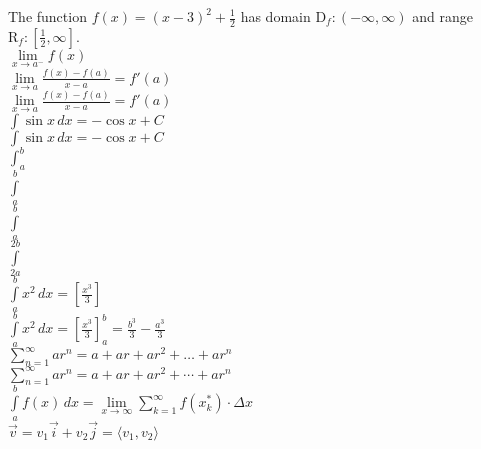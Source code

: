 \documentclass[11pt, a4paper]{article}
\begin{document}
The function $f(x) = (x-3)^2 + \frac{1}{2}$ has domain $\mathrm{D}_f:(-\infty, \infty)$ and range $\mathrm{R}_f:\left [\frac{1}{2}, \infty \right ]$. \\



$\lim \limits_{x \to a^-} f(x) $ \\

$\lim \limits_{x \to a} \frac{f(x) - f(a)}{x-a} = f'(a)$ \\

$\displaystyle{\lim \limits_{x \to a} \frac{f(x) - f(a)}{x-a} = f'(a)}$ \\

$\int \sin x\, dx = -\cos x + C$ \\ %

$\displaystyle{\int \sin x\, dx = -\cos x + C}$ \\ %


$\int_{a}^{b}$ \\

$\int \limits_a^{b}$\\

$\displaystyle{\int \limits_a^{b}}$\\

$\displaystyle{\int \limits_{2a}^{2b}}$\\

$\displaystyle{\int \limits_{a}^{b} x^2\, dx} =[ \frac{x^3}{3}]$\\

$\displaystyle{\int \limits_{a}^{b} x^2\, dx} = \left [ \frac{x^3}{3}\right ] _{a}^{b} = \frac{b^3}{3} - \frac{a^3}{3}$\\


$\displaystyle{ \sum \limits_{n = 1} ^ {\infty} ar^n = a + ar +ar^2 + \dots + ar^n}$\\

$\displaystyle{ \sum \limits_{n = 1} ^ {\infty} ar^n = a + ar +ar^2 + \cdots + ar^n}$\\


$\displaystyle{\int \limits_a^b f(x)\, dx = \lim \limits_{x  \to \infty}  \sum \limits_{k = 1}^\infty f(x^*_k) \cdot \Delta x}$\\


$  \vec{v} = v_1 \vec{i} + v_2 \vec{j} = \langle v_1, v_2 \rangle$
\end{document}
